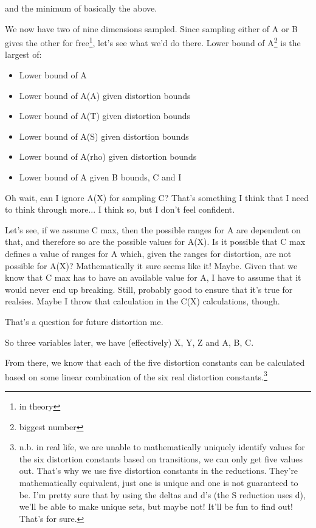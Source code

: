 \documentclass[12pt]{article}
\renewcommand{\,}{\textsuperscript{,}}
\begin{document}
and the minimum of basically the above.

We now have two of nine dimensions sampled.  
Since sampling either of A or B gives the other for free\footnote{in theory}, let's see what we'd do there.  
Lower bound of A\footnote{biggest number} is the largest of:  
\begin{itemize}  
\item Lower bound of A  
\item Lower bound of A(A) given distortion bounds  
\item Lower bound of A(T) given distortion bounds  
\item Lower bound of A(S) given distortion bounds  
\item Lower bound of A(rho) given distortion bounds  
\item Lower bound of A given B bounds, C and I

\end{itemize}

Oh wait, can I ignore A(X) for sampling C?  
That's something I think that I need to think through more... I think so, but I don't feel confident.

Let's see, if we assume C max, then the possible ranges for A are dependent on that, and therefore so are the possible values for A(X).  
Is it possible that C max defines a value of ranges for A which, given the ranges for distortion, are not possible for A(X)?  
Mathematically it sure seems like it!  
Maybe.  
Given that we know that C max has to have an available value for A, I have to assume that it would never end up breaking.  
Still, probably good to ensure that it's true for realsies.  
Maybe I throw that calculation in the C(X) calculations, though.

That's a question for future distortion me.

So three variables later, we have (effectively) X, Y, Z and A, B, C.

From there, we know that each of the five distortion constants can be calculated based on some linear combination of the six real distortion constants.\footnote{n.b. in real life, we are unable to mathematically uniquely identify values for the six distortion constants based on transitions, we can only get five values out. That's why we use five distortion constants in the reductions. They're mathematically equivalent, just one is unique and one is not guaranteed to be. I'm pretty sure that by using the deltas and d's (the S reduction uses d), we'll be able to make unique sets, but maybe not! It'll be fun to find out! That's for sure.}
\end{document}

